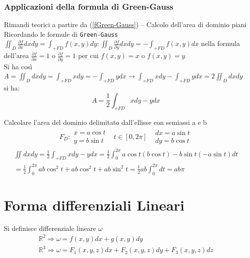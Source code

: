 \subsubsection{Applicazioni della formula di Green-Gauss}
Rimandi teorici a partire da (\ref{fGreen-Gauss}) -- Calcolo dell'area di
dominio piani\\
Ricordando le formule di \texttt{Green-Gauss} $\iint_D \frac{\partial
f}{\partial x}dxdy=\int_{+FD} f(x,y)dy:\iint_D \frac{\partial f}{\partial
y}dxdy =-\int_{+FD}f(x,y)dx$ nella formula dell'area $\frac{\partial
f}{\partial x}=1$ o $\frac{\partial f}{\partial y}=1$ per cui $f(x,y)=x$ o
$f(x,y)=y$\\
Si ha così $A=\iint_D dxdy=\int_{+FD}xdy=-\int_{+FD}ydx\to
\int_{+FD}xdy-\int_{+FD}ydx=2\iint_Ddxdy$ si ha:
\begin{equation*}
	\boxed{A=\frac{1}{2}\int_{+FD}xdy-ydx}
\end{equation*}
\clearpage
\begin{esempio}
	Calcolare l'area del dominio delimitato dall'ellisse con semiassi a e b
	\begin{eqnarray*}
		F_D:\begin{matrix}
			x=a\cos t \\
			y=b\sin t
		\end{matrix}& t\in [0,2\pi]&\begin{matrix}
			dx=a\sin t \\
			dy=b\cos t
		\end{matrix}
	\end{eqnarray*}
	\begin{eqnarray*}
		\iint dxdy= \frac{1}{2}\int_{+FD}xdy-ydx=\frac{1}{2}\int_{0}^{2\pi}a
		\cos t (b\cos t)- b\sin t (-a \sin
		t)dt\\=\frac{1}{2}\int_{0}^{2\pi}ab\cos^2t+ab\cos^2 t +
		ab\sin^2t=\frac{1}{2}ab\int_{0}^{2\pi}dt=ab\pi
	\end{eqnarray*}
\end{esempio}

\section{Forma differenziali Lineari}
Si definisce differenziale lineare $\omega$
\begin{align*}
	\mathds{R}^2\Rightarrow \omega=f(x,y)dx+g(x,y)dy\\
	\mathds{R}^3\Rightarrow \omega= F_1(x,y,z)dx+F_2(x,y,z)dy+F_3(x,y,z)dz
\end{align*}
